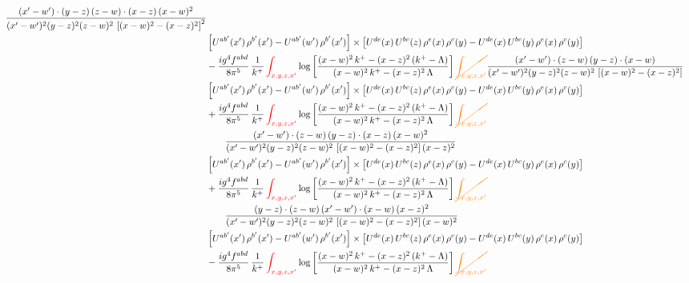 \documentclass[9pt]{article}
\numberwithin{equation}{section}
\begin{document}
\begin{align}
\frac{(x'-w')\cdot(y-z)\,(z-w)\cdot(x-z)\,(x-w)^{2}}{(x'-w')^{2}(y-z)^{2}(z-w)^{2}\,\left[(x-w)^{2}-(x-z)^{2}\right]^{2}}\notag \\ 
&\left[U^{ab'}(x')\,\rho^{b'}(x')-U^{ab'}(w')\, \rho^{b'}(x')\right]\times \left[U^{de}(x)\,U^{bc}(z)\, \rho^{e}(x)\,\rho^{c}(y)-U^{de}(x)\,U^{bc}(y)\,\rho^{e}(x)\,\rho^{c}(y)\right]\notag \\ & -\frac{ig^{4}f^{abd}}{8\pi^{5}}\,\frac{1}{k^{+}}\,{\color{red}\int_{x,y,z,x'}}\log{\left[\frac{(x-w)^{2}\,k^{+}-(x-z)^{2}\,(k^{+}-\Lambda)}{(x-w)^{2}\,k^{+}-(x-z)^{2}\,\Lambda}\right]}\,{\color{orange}\cancel{\int_{x,y,z,x'}}}
\frac{(x'-w')\cdot(z-w)\,(y-z)\cdot(x-w)}{(x'-w')^{2}(y-z)^{2}(z-w)^{2}\,\left[(x-w)^{2}-(x-z)^{2}\right]}\notag \\ & \left[U^{ab'}(x')\,\rho^{b'}(x')-U^{ab'}(w')\, \rho^{b'}(x')\right]\times \left[U^{de}(x)\,U^{bc}(z)\, \rho^{e}(x)\,\rho^{c}(y)-U^{de}(x)\,U^{bc}(y)\,\rho^{e}(x)\,\rho^{c}(y)\right]\notag \\ &  +\frac{ig^{4}f^{abd}}{8\pi^{5}}\,\frac{1}{k^{+}}\,{\color{red}\int_{x,y,z,x'}}\log{\left[\frac{(x-w)^{2}\,k^{+}-(x-z)^{2}\,(k^{+}-\Lambda)}{(x-w)^{2}\,k^{+}-(x-z)^{2}\,\Lambda}\right]}\,{\color{orange}\cancel{\int_{x,y,z,x'}}}\notag \\ & \qquad
\frac{(x'-w')\cdot(z-w)\,(y-z)\cdot(x-z)\,(x-w)^{2}}{(x'-w')^{2}(y-z)^{2}(z-w)^{2}\,\left[(x-w)^{2}-(x-z)^{2}\right](x-z)^{2}}\notag \\ & \left[U^{ab'}(x')\,\rho^{b'}(x')-U^{ab'}(w')\, \rho^{b'}(x')\right]\times \left[U^{de}(x)\,U^{bc}(z)\, \rho^{e}(x)\,\rho^{c}(y)-U^{de}(x)\,U^{bc}(y)\,\rho^{e}(x)\,\rho^{c}(y)\right]\notag \\ & +\frac{ig^{4}f^{abd}}{8\pi^{5}}\,\frac{1}{k^{+}}\,{\color{red}\int_{x,y,z,x'}}\log{\left[\frac{(x-w)^{2}\,k^{+}-(x-z)^{2}\,(k^{+}-\Lambda)}{(x-w)^{2}\,k^{+}-(x-z)^{2}\,\Lambda}\right]}\,{\color{orange}\cancel{\int_{x,y,z,x'}}}\notag \\ & \qquad
\frac{(y-z)\cdot(z-w)\,(x'-w')\cdot(x-w)\,(x-z)^{2}}{(x'-w')^{2}(y-z)^{2}(z-w)^{2}\,\left[(x-w)^{2}-(x-z)^{2}\right](x-w)^{2}}\notag \\ 
& \left[U^{ab'}(x')\,\rho^{b'}(x')-U^{ab'}(w')\, \rho^{b'}(x')\right]\times \left[U^{de}(x)\,U^{bc}(z)\, \rho^{e}(x)\,\rho^{c}(y)-U^{de}(x)\,U^{bc}(y)\,\rho^{e}(x)\,\rho^{c}(y)\right]\notag \\ & -\frac{ig^{4}f^{abd}}{8\pi^{5}}\,\frac{1}{k^{+}}\,{\color{red}\int_{x,y,z,x'}}\log{\left[\frac{(x-w)^{2}\,k^{+}-(x-z)^{2}\,(k^{+}-\Lambda)}{(x-w)^{2}\,k^{+}-(x-z)^{2}\,\Lambda}\right]}\,{\color{orange}\cancel{\int_{x,y,z,x'}}}

\end{align}
\end{document}
